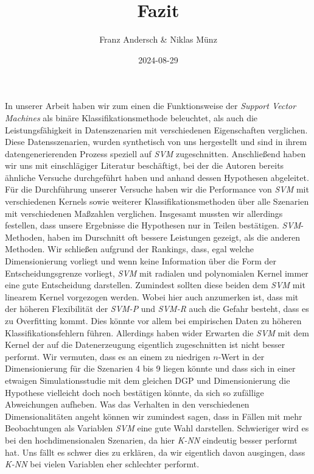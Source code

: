 \documentclass[
]{article}
\title{Fazit}
\author{Franz Andersch \& Niklas Münz}
\date{2024-08-29}
\renewcommand{\maketitle}{}
\begin{document}
\maketitle

In unserer Arbeit haben wir zum einen die Funktionsweise der
\textit{Support Vector Machines} als binäre Klassifikationsmethode
beleuchtet, als auch die Leistungsfähigkeit in Datenszenarien mit
verschiedenen Eigenschaften verglichen. Diese Datensszenarien, wurden
synthetisch von uns hergestellt und sind in ihrem datengenerierenden
Prozess speziell auf \textit{SVM} zugeschnitten. Anschließend haben wir
uns mit einschlägiger Literatur beschäftigt, bei der die Autoren bereits
ähnliche Versuche durchgeführt haben und anhand dessen Hypothesen
abgeleitet. Für die Durchführung unserer Versuche haben wir die
Performance von \textit{SVM} mit verschiedenen Kernels sowie weiterer
Klassifikationsmethoden über alle Szenarien mit verschiedenen Maßzahlen
verglichen. \newline  Insgesamt mussten wir allerdings festellen, dass
unsere Ergebnisse die Hypothesen nur in Teilen bestätigen.
\textit{SVM}-Methoden, haben im Durschnitt oft bessere Leistungen
gezeigt, als die anderen Methoden. Wir schließen aufgrund der Rankings,
dass, egal welche Dimensionierung vorliegt und wenn keine Information
über die Form der Entscheidungsgrenze vorliegt, \textit{SVM} mit
radialen und polynomialen Kernel immer eine gute Entscheidung
darstellen. Zumindest sollten diese beiden dem \textit{SVM} mit linearem
Kernel vorgezogen werden. Wobei hier auch anzumerken ist, dass mit der
höheren Flexibilität der \textit{SVM-P} und \textit{SVM-R} auch die
Gefahr besteht, dass es zu Overfitting kommt. Dies könnte vor allem bei
empirischen Daten zu höheren Klassifikationsfehlern führen.\newline
Allerdings haben wider Erwarten die \textit{SVM} mit dem Kernel der auf
die Datenerzeugung eigentlich zugeschnitten ist nicht besser performt.
Wir vermuten, dass es an einem zu niedrigen \(n\)-Wert in der
Dimensionierung für die Szenarien 4 bis 9 liegen könnte und dass sich in
einer etwaigen Simulationsstudie mit dem gleichen DGP und
Dimensionierung die Hypothese vielleicht doch noch bestätigen könnte, da
sich so zufällige Abweichungen aufheben. Was das Verhalten in den
verschiedenen Dimensionalitäten angeht können wir zumindest sagen, dass
in Fällen mit mehr Beobachtungen als Variablen \textit{SVM} eine gute
Wahl darstellen. Schwieriger wird es bei den hochdimensionalen
Szenarien, da hier \textit{K-NN} eindeutig besser performt hat. Uns
fällt es schwer dies zu erklären, da wir eigentlich davon ausgingen,
dass \textit{K-NN} bei vielen Variablen eher schlechter performt.
\end{document}
